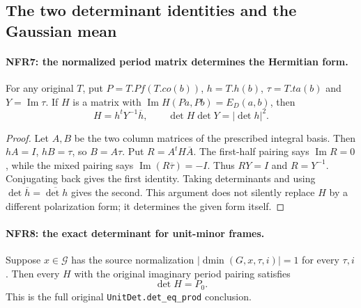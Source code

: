 \documentclass[11pt,a4paper]{article}
\numberwithin{equation}{section}
\theoremstyle{remark}\newtheorem{remark}[theorem]{Remark}
\begin{document}
\subsection{The two determinant identities and the Gaussian mean}

\paragraph{NFR7: the normalized period matrix determines the Hermitian form.}
\label{claim:NFR7}
For any original $T$, put $P=T.Pf(T.co(b))$, $h=T.h(b)$,
$\tau=T.ta(b)$ and $Y=\operatorname{Im}\tau$.
If $H$ is a matrix with
$\operatorname{Im}H(Pa,Pb)=E_D(a,b)$, then
\[
 H=h^tY^{-1}\overline h,
 \qquad \det H\det Y=|\det h|^2.
 \tag{NFR.15}
\]

\begin{proof}
Let $A,B$ be the two column matrices of the prescribed integral
basis.  Then $hA=I$, $hB=\tau$, so $B=A\tau$.
Put $R=A^tH\overline A$.  The first-half pairing says
$\operatorname{Im}R=0$, while the mixed pairing says
$\operatorname{Im}(R\overline\tau)=-I$.
Thus $RY=I$ and $R=Y^{-1}$.  Conjugating back gives the first
identity.  Taking determinants and using
$\det\overline h=\overline{\det h}$ gives the second.
This argument does not silently replace $H$ by a different
polarization form; it determines the given form itself.
\end{proof}

\paragraph{NFR8: the exact determinant for unit-minor frames.}
\label{claim:NFR8}
Suppose $x\in\mathcal G$ has the source normalization
$|\operatorname{dmin}(G,x,\tau,i)|=1$ for every $\tau,i$.
Then every $H$ with the original imaginary period pairing satisfies
\[
                     \det H=P_0.                     \tag{NFR.16}
\]
This is the full original \texttt{Unit\allowbreak Det.\allowbreak det\_\allowbreak eq\_\allowbreak prod} conclusion.
\end{document}
